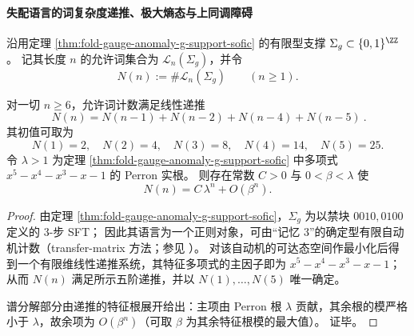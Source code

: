 
\paragraph{失配语言的词复杂度递推、极大熵态与上同调障碍}\label{par:fold-gauge-anomaly-mismatch-language-word-complexity}
沿用定理 \ref{thm:fold-gauge-anomaly-g-support-sofic} 的有限型支撑 \(\Sigma_g\subset\{0,1\}^{\ZZ}\)。
记其长度 \(n\) 的允许词集合为 \(\mathcal L_n(\Sigma_g)\)，并令
\[
N(n):=\#\mathcal L_n(\Sigma_g)\qquad(n\ge 1).
\]

\begin{proposition}[允许词计数的精确递推与指数谱分解]\label{prop:fold-gauge-anomaly-mismatch-language-word-count-recurrence}
对一切 \(n\ge 6\)，允许词计数满足线性递推
\[
\boxed{\ N(n)=N(n-1)+N(n-2)+N(n-4)+N(n-5)\ }.
\]
其初值可取为
\[
N(1)=2,\quad N(2)=4,\quad N(3)=8,\quad N(4)=14,\quad N(5)=25.
\]
令 \(\lambda>1\) 为定理 \ref{thm:fold-gauge-anomaly-g-support-sofic} 中多项式
\(
x^5-x^4-x^3-x-1
\)
的 Perron 实根。
则存在常数 \(C>0\) 与 \(0<\beta<\lambda\) 使
\[
N(n)=C\,\lambda^{n}+O(\beta^{n}).
\]
\end{proposition}
\begin{proof}
由定理 \ref{thm:fold-gauge-anomaly-g-support-sofic}，\(\Sigma_g\) 为以禁块 \(0010,0100\) 定义的 \(3\)-步 SFT；
因此其语言为一个正则对象，可由“记忆 \(3\)”的确定型有限自动机计数（transfer-matrix 方法；参见 \cite{LindMarcus1995,Kitchens1998SymbolicDynamics}）。
对该自动机的可达态空间作最小化后得到一个有限维线性递推系统，其特征多项式的主因子即为
\(
x^5-x^4-x^3-x-1
\)；
从而 \(N(n)\) 满足所示五阶递推，并以 \(N(1),\dots,N(5)\) 唯一确定。
\par
谱分解部分由递推的特征根展开给出：主项由 Perron 根 \(\lambda\) 贡献，其余根的模严格小于 \(\lambda\)，故余项为 \(O(\beta^n)\)（可取 \(\beta\) 为其余特征根模的最大值）。
证毕。
\end{proof}

